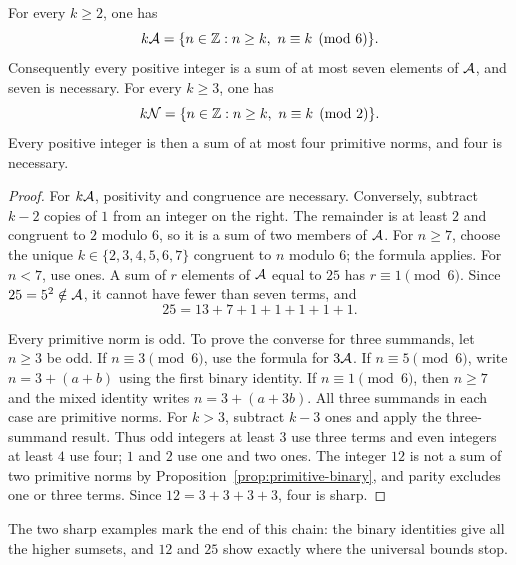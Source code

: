 \begin{proposition}\label{prop:higher-sumsets}
For every $k\ge2$, one has
\[
k\AA=\{n\in\Z:n\ge k,\ n\equiv k\pmod6\}.
\]
Consequently every positive integer is a sum of at most seven elements
of $\AA$, and seven is necessary. For every $k\ge3$, one has
\[
k\NN=\{n\in\Z:n\ge k,\ n\equiv k\pmod2\}.
\]
Every positive integer is then a sum of at most four primitive norms,
and four is necessary.
\end{proposition}
\begin{proof}
For $k\AA$, positivity and congruence are necessary. Conversely, subtract
$k-2$ copies of $1$ from an integer on the right. The remainder is at
least $2$ and congruent to $2$ modulo $6$, so it is a sum of two members
of $\AA$. For $n\ge7$, choose the unique $k\in\{2,3,4,5,6,7\}$ congruent
to $n$ modulo $6$; the formula applies. For $n<7$, use ones.
A sum of $r$ elements of $\AA$ equal to $25$ has $r\equiv1\pmod6$.
Since $25=5^2\notin\AA$, it cannot have fewer than seven terms, and
\[
25=13+7+1+1+1+1+1.
\]

Every primitive norm is odd. To prove the converse for three summands,
let $n\ge3$ be odd. If $n\equiv3\pmod6$, use the formula for $3\AA$.
If $n\equiv5\pmod6$, write $n=3+(a+b)$ using the first binary identity.
If $n\equiv1\pmod6$, then $n\ge7$ and the mixed identity writes
$n=3+(a+3b)$. All three summands in each case are primitive norms.
For $k>3$, subtract $k-3$ ones and apply the three-summand result.
Thus odd integers at least $3$ use three terms and even integers at least
$4$ use four; $1$ and $2$ use one and two ones. The integer $12$ is not
a sum of two primitive norms by Proposition~\ref{prop:primitive-binary},
and parity excludes one or three terms. Since $12=3+3+3+3$, four is sharp.
\end{proof}

The two sharp examples mark the end of this chain: the binary identities
give all the higher sumsets, and $12$ and $25$ show exactly where the
universal bounds stop.
